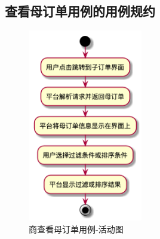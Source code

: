 \subsection{查看母订单用例的用例规约}
\begin{figure}[htp]
    \centering
    \includegraphics[width=5cm]{figure/usecase_v2/query_mainOrder.png}
    \caption{商查看母订单用例-活动图}
    \label{fig:uc_order_query-uml}
\end{figure}

